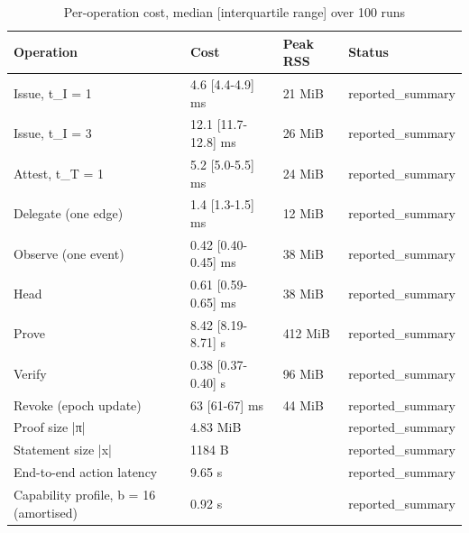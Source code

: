 \begin{table}[t]
\centering
\caption{Per-operation cost, median [interquartile range] over 100 runs}
\begin{tabular}{llll}
\hline
Operation & Cost & Peak RSS & Status \\
\hline
Issue, t\_I = 1 & 4.6 [4.4-4.9] ms & 21 MiB & reported\_summary \\
Issue, t\_I = 3 & 12.1 [11.7-12.8] ms & 26 MiB & reported\_summary \\
Attest, t\_T = 1 & 5.2 [5.0-5.5] ms & 24 MiB & reported\_summary \\
Delegate (one edge) & 1.4 [1.3-1.5] ms & 12 MiB & reported\_summary \\
Observe (one event) & 0.42 [0.40-0.45] ms & 38 MiB & reported\_summary \\
Head & 0.61 [0.59-0.65] ms & 38 MiB & reported\_summary \\
Prove & 8.42 [8.19-8.71] s & 412 MiB & reported\_summary \\
Verify & 0.38 [0.37-0.40] s & 96 MiB & reported\_summary \\
Revoke (epoch update) & 63 [61-67] ms & 44 MiB & reported\_summary \\
Proof size |π| & 4.83 MiB &  & reported\_summary \\
Statement size |x| & 1184 B &  & reported\_summary \\
End-to-end action latency & 9.65 s &  & reported\_summary \\
Capability profile, b = 16 (amortised) & 0.92 s &  & reported\_summary \\
\hline
\end{tabular}
\end{table}
